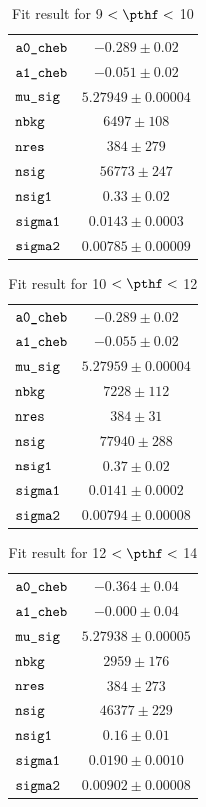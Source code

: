 \begin{table}[H]
    \centering
    \caption{Fit result for 9 $ < \pthf < $ 10}
    \label{tab:fit_results_pthf7}
\begin{tabular}{lc}
$\verb+a0_cheb+ $ & $ -0.289\pm 0.02$\\
$\verb+a1_cheb+ $ & $ -0.051\pm 0.02$\\
$\verb+mu_sig+ $ & $  5.27949\pm 0.00004$\\
$\verb+nbkg+ $ & $  6497\pm 108$\\
$\verb+nres+ $ & $  384\pm 279$\\
$\verb+nsig+ $ & $  56773\pm 247$\\
$\verb+nsig1+ $ & $  0.33\pm 0.02$\\
$\verb+sigma1+ $ & $  0.0143\pm 0.0003$\\
$\verb+sigma2+ $ & $  0.00785\pm 0.00009$\\
\end{tabular}
\end{table}
\begin{table}[H]
    \centering
    \caption{Fit result for 10 $ < \pthf < $ 12}
    \label{tab:fit_results_pthf8}
\begin{tabular}{lc}
$\verb+a0_cheb+ $ & $ -0.289\pm 0.02$\\
$\verb+a1_cheb+ $ & $ -0.055\pm 0.02$\\
$\verb+mu_sig+ $ & $  5.27959\pm 0.00004$\\
$\verb+nbkg+ $ & $  7228\pm 112$\\
$\verb+nres+ $ & $  384\pm 31$\\
$\verb+nsig+ $ & $  77940\pm 288$\\
$\verb+nsig1+ $ & $  0.37\pm 0.02$\\
$\verb+sigma1+ $ & $  0.0141\pm 0.0002$\\
$\verb+sigma2+ $ & $  0.00794\pm 0.00008$\\
\end{tabular}
\end{table}
\begin{table}[H]
    \centering
    \caption{Fit result for 12 $ < \pthf < $ 14}
    \label{tab:fit_results_pthf9}
\begin{tabular}{lc}
$\verb+a0_cheb+ $ & $ -0.364\pm 0.04$\\
$\verb+a1_cheb+ $ & $ -0.000\pm 0.04$\\
$\verb+mu_sig+ $ & $  5.27938\pm 0.00005$\\
$\verb+nbkg+ $ & $  2959\pm 176$\\
$\verb+nres+ $ & $  384\pm 273$\\
$\verb+nsig+ $ & $  46377\pm 229$\\
$\verb+nsig1+ $ & $  0.16\pm 0.01$\\
$\verb+sigma1+ $ & $  0.0190\pm 0.0010$\\
$\verb+sigma2+ $ & $  0.00902\pm 0.00008$\\
\end{tabular}
\end{table}
